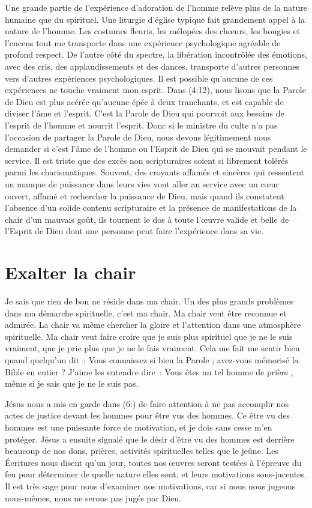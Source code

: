 Une grande partie de l'expérience d'adoration de l'homme relève plus
 de la nature humaine que du spirituel.
 Une liturgie d'église typique fait grandement appel à la nature de l'homme.
 Les costumes fleuris, les mélopées des chœurs, les bougies et l'encens
 \ocadr tout me transporte dans une expérience psychologique agréable
 de profond respect. De l'autre côté du spectre, la libération incontrôlée
 des émotions, avec des cris, des applaudissements et des dances,
 transporte d'autres personnes vers d'autres expériences psychologiques.
 Il est possible qu'aucune de ces expériences ne touche vraiment mon esprit.
 Dans (4:12), nous lisons que la Parole de Dieu
 est plus acérée qu'aucune épée à deux tranchants,
 et est capable de diviser l'âme et l'esprit.
 C'est la Parole de Dieu qui pourvoit aux besoins de l'esprit de l'homme
 et nourrit l'esprit. Donc si le ministre du culte n'a pas l'occasion
 de partager la Parole de Dieu, nous devons légitimement nous demander
 si c'est l'âme de l'homme ou l'Esprit de Dieu qui se mouvait pendant
 le service. Il est triste que des excès non scripturaires soient si
 librement tolérés parmi les charismatiques.
 Souvent, des croyants affamés et sincères qui ressentent un manque
 de puissance dans leurs vies vont aller au service avec un cœur ouvert,
 affamé et rechercher la puissance de Dieu, mais quand ils constatent
 l'absence d'un solide contenu scripturaire et la présence
 de manifestations de la chair d'un mauvais goût, ils tournent le dos
 à toute l'œuvre valide et belle de l'Esprit de Dieu dont une personne
 peut faire l'expérience dans sa vie.


\section{Exalter la chair}

Je sais que rien de bon ne réside dans ma chair.
 Un des plus grands problèmes dans ma démarche spirituelle, c'est ma chair.
 Ma chair veut être reconnue et admirée. La chair va même chercher
 la gloire et l'attention dans une atmosphère spirituelle.
 Ma chair veut faire croire que je suis plus spirituel que je ne le suis
 vraiment, que je prie plus que je ne le fais vraiment.
 Cela me fait me sentir bien quand quelqu'un dit~:
 \og Vous connaissez si bien la Parole ; avez-vous mémorisé la Bible
 en entier ? \fg{} J'aime les entendre dire~:
 \og Vous êtes un tel homme de prière \fg{}, même si je sais
 que je ne le suis pas.

Jésus nous a mis en garde dans (6:) de faire attention
 à ne pas accomplir nos actes de justice devant les hommes
 pour être vus des hommes. Ce \og être vu des hommes \fg{} est une
 puissante force de motivation, et je dois sans cesse m'en protéger.
 Jésus a ensuite signalé que le désir d'être vu des hommes
 est derrière beaucoup de nos dons, prières, activités spirituelles
 telles que le jeûne. Les Écritures nous disent qu'un jour,
 toutes nos œuvres seront testées à l'épreuve du feu pour déterminer
 de quelle nature elles sont, et leurs motivations sous-jacentes.
 Il est très sage pour nous d'examiner nos motivations,
 car si nous nous jugeons nous-mêmes, nous ne serons pas jugés par Dieu.

